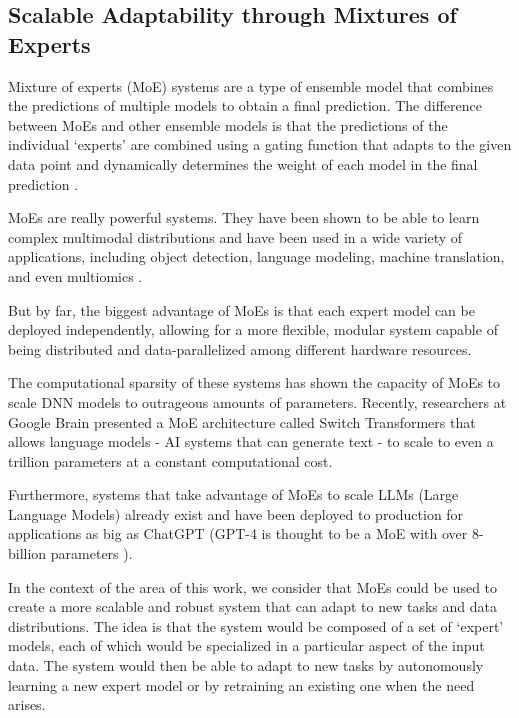 \documentclass[../main.tex]{subfiles}
\begin{document}
    \subsection{Scalable Adaptability through Mixtures of Experts} \label{conclusions:research_directions:moes} 

    Mixture of experts (MoE) systems are a type of ensemble model that combines the predictions of multiple models to obtain a final prediction. The difference between MoEs and other ensemble models is that the predictions of the individual `experts' are combined using a gating function that adapts to the given data point and dynamically determines the weight of each model in the final prediction \cite{chen_towards_2022}.

    MoEs are really powerful systems. They have been shown to be able to learn complex multimodal distributions and have been used in a wide variety of applications, including object detection, language modeling, machine translation, and even multiomics \cite{hwang_tutel_2023,mustafa_multimodal_2022,shazeer_outrageously_2017, minoura_scmm_2021}.
    
    But by far, the biggest advantage of MoEs is that each expert model can be deployed independently, allowing for a more flexible, modular system capable of being distributed and data-parallelized among different hardware resources. 

    The computational sparsity of these systems has shown the capacity of MoEs to scale DNN models to outrageous amounts of parameters. Recently, researchers at Google Brain presented a MoE architecture called Switch Transformers \cite{fedusSwitchTransformersScaling2022a} that allows language models - AI systems that can generate text - to scale to even a trillion parameters at a constant computational cost.
    
    Furthermore, systems that take advantage of MoEs to scale LLMs (Large Language Models) already exist and have been deployed to production for applications as big as ChatGPT (GPT-4 is thought to be a MoE with over 8-billion parameters ).
    
    In the context of the area of this work, we consider that MoEs could be used to create a more scalable and robust system that can adapt to new tasks and data distributions. The idea is that the system would be composed of a set of `expert' models, each of which would be specialized in a particular aspect of the input data. The system would then be able to adapt to new tasks by autonomously learning a new expert model or by retraining an existing one when the need arises.
    
\end{document}
